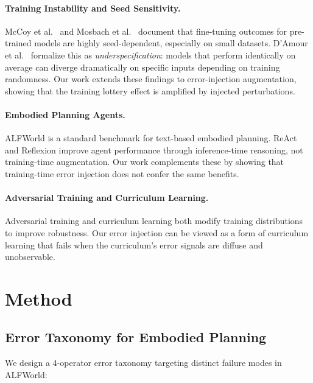 \documentclass[11pt,a4paper]{article}
\begin{document}
\paragraph{Training Instability and Seed Sensitivity.}
McCoy et al.\ \citeyearpar{mccoy2020} and Mosbach et al.\ \citeyearpar{mosbach2021} document that fine-tuning outcomes for pre-trained models are highly seed-dependent, especially on small datasets.
D'Amour et al.\ \citeyearpar{damour2022} formalize this as \emph{underspecification}: models that perform identically on average can diverge dramatically on specific inputs depending on training randomness.
Our work extends these findings to error-injection augmentation, showing that the training lottery effect is amplified by injected perturbations.

\paragraph{Embodied Planning Agents.}
ALFWorld \cite{alfworld2021} is a standard benchmark for text-based embodied planning.
ReAct \cite{yao2023react} and Reflexion \cite{shinn2023reflexion} improve agent performance through inference-time reasoning, not training-time augmentation.
Our work complements these by showing that training-time error injection does not confer the same benefits.

\paragraph{Adversarial Training and Curriculum Learning.}
Adversarial training \cite{madry2018} and curriculum learning \cite{bengio2009} both modify training distributions to improve robustness.
Our error injection can be viewed as a form of curriculum learning that fails when the curriculum's error signals are diffuse and unobservable.

\section{Method}
\label{sec:method}

\subsection{Error Taxonomy for Embodied Planning}

We design a 4-operator error taxonomy targeting distinct failure modes in ALFWorld:
\end{document}
